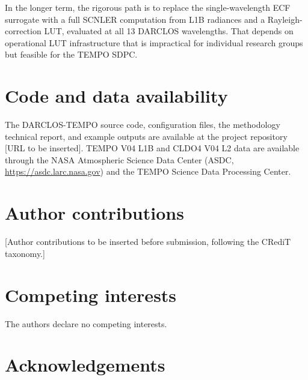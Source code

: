 \documentclass[11pt,a4paper]{article}
\begin{document}
In the longer term, the rigorous path is to replace the
single-wavelength ECF surrogate with a full SCNLER computation from
L1B radiances and a Rayleigh-correction LUT, evaluated at all 13
DARCLOS wavelengths. That depends on operational LUT infrastructure
that is impractical for individual research groups but feasible for
the TEMPO SDPC.

\section*{Code and data availability}

The DARCLOS-TEMPO source code, configuration files, the methodology
technical report, and example outputs are available at the project
repository [URL to be inserted]. TEMPO V04 L1B and CLDO4 V04 L2 data
are available through the NASA Atmospheric Science Data Center (ASDC,
\url{https://asdc.larc.nasa.gov}) and the TEMPO Science Data Processing
Center.

\section*{Author contributions}

[Author contributions to be inserted before submission, following the
CRediT taxonomy.]

\section*{Competing interests}

The authors declare no competing interests.

\section*{Acknowledgements}
\end{document}
